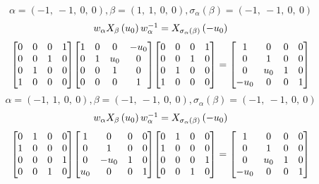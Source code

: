 \documentclass[11pt]{article}
\theoremstyle{definition}
\begin{document}
\[
\alpha = \left( -1, \  -1, \  0, \  0\right), \beta = \left( 1, \  1, \  0, \  0\right), \sigma_{\alpha}(\beta) = \left( -1, \  -1, \  0, \  0\right)
\]
\[
\scaletoalign{\textwidth}{w_{\alpha} X_{\beta}\left(u_{0}\right) w_{\alpha}^{-1} = X_{\sigma_{\alpha}\left(\beta\right)}\left(- u_{0}\right)}
\]
\[
\scaletoalign{\textwidth}{{\left[\begin{matrix}0 & 0 & 0 & 1\\0 & 0 & 1 & 0\\0 & 1 & 0 & 0\\1 & 0 & 0 & 0\end{matrix}\right]} {\left[\begin{matrix}1 & 0 & 0 & - u_{0}\\0 & 1 & u_{0} & 0\\0 & 0 & 1 & 0\\0 & 0 & 0 & 1\end{matrix}\right]} {\left[\begin{matrix}0 & 0 & 0 & 1\\0 & 0 & 1 & 0\\0 & 1 & 0 & 0\\1 & 0 & 0 & 0\end{matrix}\right]} = {\left[\begin{matrix}1 & 0 & 0 & 0\\0 & 1 & 0 & 0\\0 & u_{0} & 1 & 0\\- u_{0} & 0 & 0 & 1\end{matrix}\right]}}
\]
\[
\alpha = \left( -1, \  1, \  0, \  0\right), \beta = \left( -1, \  -1, \  0, \  0\right), \sigma_{\alpha}(\beta) = \left( -1, \  -1, \  0, \  0\right)
\]
\[
\scaletoalign{\textwidth}{w_{\alpha} X_{\beta}\left(u_{0}\right) w_{\alpha}^{-1} = X_{\sigma_{\alpha}\left(\beta\right)}\left(- u_{0}\right)}
\]
\[
\scaletoalign{\textwidth}{{\left[\begin{matrix}0 & 1 & 0 & 0\\1 & 0 & 0 & 0\\0 & 0 & 0 & 1\\0 & 0 & 1 & 0\end{matrix}\right]} {\left[\begin{matrix}1 & 0 & 0 & 0\\0 & 1 & 0 & 0\\0 & - u_{0} & 1 & 0\\u_{0} & 0 & 0 & 1\end{matrix}\right]} {\left[\begin{matrix}0 & 1 & 0 & 0\\1 & 0 & 0 & 0\\0 & 0 & 0 & 1\\0 & 0 & 1 & 0\end{matrix}\right]} = {\left[\begin{matrix}1 & 0 & 0 & 0\\0 & 1 & 0 & 0\\0 & u_{0} & 1 & 0\\- u_{0} & 0 & 0 & 1\end{matrix}\right]}}
\]
\end{document}
